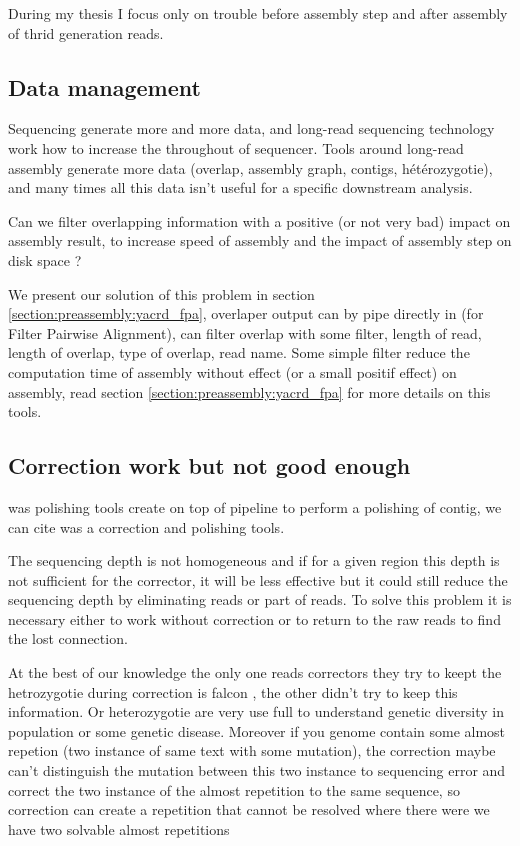 \documentclass[./main.tex]{subfiles}
\begin{document}
During my thesis I focus only on trouble before assembly step and after assembly of thrid generation reads.

\subsection{Data management}

Sequencing generate more and more data, and long-read sequencing technology work how to increase the throughout of sequencer. Tools around long-read assembly generate more data (overlap, assembly graph, contigs, hétérozygotie), and many times all this data isn't useful for a specific downstream analysis.

Can we filter overlapping information with a positive (or not very bad) impact on assembly result, to increase speed of assembly and the impact of assembly step on disk space ?

We present our solution of this problem \fpa in section \ref{section:preassembly:yacrd_fpa}, overlaper output can by pipe directly in \fpa (for Filter Pairwise Alignment), \fpa can filter overlap with some filter, length of read, length of overlap, type of overlap, read name. Some simple \fpa filter reduce the computation time of assembly without effect (or a small positif effect) on assembly, read section \ref{section:preassembly:yacrd_fpa} for more details on this tools.

\subsection{Correction work but not good enough}


 was polishing tools create on top of \miniasm pipeline to perform a polishing of contig, we can cite  was a correction and polishing tools.

The sequencing depth is not homogeneous and if for a given region this depth is not sufficient for the corrector, it will be less effective but it could still reduce the sequencing depth by eliminating reads or part of reads. To solve this problem it is necessary either to work without correction or to return to the raw reads to find the lost connection.

At the best of our knowledge the only one reads correctors they try to keept the hetrozygotie during correction is falcon \cite{falcon}, the other didn't try to keep this information. Or heterozygotie are very use full to understand genetic diversity in population or some genetic disease.
Moreover if you genome contain some almost repetion (two instance of same text with some mutation), the correction maybe can't distinguish the mutation between this two instance to sequencing error and correct the two instance of the almost repetition to the same sequence, so correction can create a repetition that cannot be resolved where there were we have two solvable almost repetitions 
\end{document}
